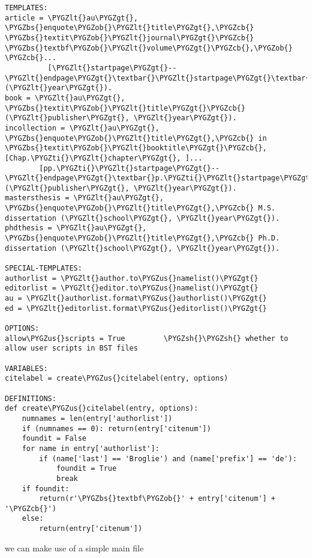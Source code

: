 \documentclass[letterpaper,10pt,english]{sphinxmanual}
\def\PYGZbs{\char`\\}
\def\PYGZus{\char`\_}
\def\PYGZob{\char`\{}
\def\PYGZcb{\char`\}}
\def\PYGZlt{\char`\<}
\def\PYGZgt{\char`\>}
\def\PYGZsh{\char`\#}
\def\PYGZti{\char`\~}
\begin{document}
\begin{Verbatim}[commandchars=\\\{\}]
TEMPLATES:
article = \PYGZlt{}au\PYGZgt{}, \PYGZbs{}enquote\PYGZob{}\PYGZlt{}title\PYGZgt{},\PYGZcb{} \PYGZbs{}textit\PYGZob{}\PYGZlt{}journal\PYGZgt{}\PYGZcb{} \PYGZbs{}textbf\PYGZob{}\PYGZlt{}volume\PYGZgt{}\PYGZcb{},\PYGZob{} \PYGZcb{}...
          [\PYGZlt{}startpage\PYGZgt{}--\PYGZlt{}endpage\PYGZgt{}\textbar{}\PYGZlt{}startpage\PYGZgt{}\textbar{}\PYGZlt{}eid\PYGZgt{}\textbar{}] (\PYGZlt{}year\PYGZgt{}).
book = \PYGZlt{}au\PYGZgt{}, \PYGZbs{}textit\PYGZob{}\PYGZlt{}title\PYGZgt{}\PYGZcb{} (\PYGZlt{}publisher\PYGZgt{}, \PYGZlt{}year\PYGZgt{}).
incollection = \PYGZlt{}au\PYGZgt{}, \PYGZbs{}enquote\PYGZob{}\PYGZlt{}title\PYGZgt{},\PYGZcb{} in \PYGZbs{}textit\PYGZob{}\PYGZlt{}booktitle\PYGZgt{}\PYGZcb{}, [Chap.\PYGZti{}\PYGZlt{}chapter\PYGZgt{}, ]...
        [pp.\PYGZti{}\PYGZlt{}startpage\PYGZgt{}--\PYGZlt{}endpage\PYGZgt{}\textbar{}p.\PYGZti{}\PYGZlt{}startpage\PYGZgt{}\textbar{}\PYGZlt{}eid\PYGZgt{}\textbar{}] (\PYGZlt{}publisher\PYGZgt{}, \PYGZlt{}year\PYGZgt{}).
mastersthesis = \PYGZlt{}au\PYGZgt{}, \PYGZbs{}enquote\PYGZob{}\PYGZlt{}title\PYGZgt{},\PYGZcb{} M.S. dissertation (\PYGZlt{}school\PYGZgt{}, \PYGZlt{}year\PYGZgt{}).
phdthesis = \PYGZlt{}au\PYGZgt{}, \PYGZbs{}enquote\PYGZob{}\PYGZlt{}title\PYGZgt{},\PYGZcb{} Ph.D. dissertation (\PYGZlt{}school\PYGZgt{}, \PYGZlt{}year\PYGZgt{}).

SPECIAL-TEMPLATES:
authorlist = \PYGZlt{}author.to\PYGZus{}namelist()\PYGZgt{}
editorlist = \PYGZlt{}editor.to\PYGZus{}namelist()\PYGZgt{}
au = \PYGZlt{}authorlist.format\PYGZus{}authorlist()\PYGZgt{}
ed = \PYGZlt{}editorlist.format\PYGZus{}editorlist()\PYGZgt{}

OPTIONS:
allow\PYGZus{}scripts = True         \PYGZsh{}\PYGZsh{} whether to allow user scripts in BST files

VARIABLES:
citelabel = create\PYGZus{}citelabel(entry, options)

DEFINITIONS:
def create\PYGZus{}citelabel(entry, options):
    numnames = len(entry['authorlist'])
    if (numnames == 0): return(entry['citenum'])
    foundit = False
    for name in entry['authorlist']:
        if (name['last'] == 'Broglie') and (name['prefix'] == 'de'):
            foundit = True
            break
    if foundit:
        return(r'\PYGZbs{}textbf\PYGZob{}' + entry['citenum'] + '\PYGZcb{}')
    else:
        return(entry['citenum'])
\end{Verbatim}

we can make use of a simple main  file
\end{document}
